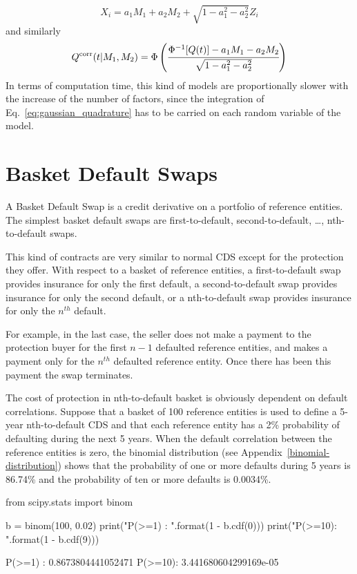 \begin{equation}
X_i = a_1 M_1 + a_2 M_2 + \sqrt{1 - a_1^2 - a^2_2}Z_i
\end{equation}
and similarly
\begin{equation}
Q^{\textrm{corr}}(t|M_1, M_2) = \Phi\left(\cfrac{\Phi^{-1}[Q(t)]-a_1 M_1 - a_2 M_2}{\sqrt{1 - a_1^2 - a^2_2}}\right)
\end{equation}
In terms of computation time, this kind of models are proportionally slower with the increase of the number of factors, since the integration of Eq.~\ref{eq:gaussian_quadrature} has to be carried on each random variable of the model.

\section{Basket Default Swaps}\label{basket-default-swaps}

A Basket Default Swap is a credit derivative on a portfolio of reference
entities. The simplest basket default swaps are first-to-default,
second-to-default, \ldots, nth-to-default swaps. 

This kind of contracts are very similar to normal CDS except for the protection they offer.
With respect to a basket of reference entities, a first-to-default swap provides insurance for only the first default, a second-to-default swap provides insurance
for only the second default, or a nth-to-default swap provides insurance for only the $n^{th}$ default. 

For example, in the last case, the seller does not make a payment to the protection buyer for
the first $n-1$ defaulted reference entities, and makes a payment only for the
$n^{th}$ defaulted reference entity. Once there has been this payment the swap terminates.

The cost of protection in nth-to-default basket is obviously dependent on default correlations. 
Suppose that a basket of 100 reference entities is used to define a 5-year nth-to-default CDS and that each reference entity has a 2\% probability of defaulting during the next
5 years. When the default correlation between the reference entities is zero, the binomial distribution (see Appendix~\ref{binomial-distribution}) 
shows that the probability of one or more defaults during 5 years is 86.74\% and the probability of ten or more defaults is 0.0034\%.

\begin{ipython}
from scipy.stats import binom

b = binom(100, 0.02)
print("P(>=1) : {}".format(1 - b.cdf(0)))
print("P(>=10): {}".format(1 - b.cdf(9)))
\end{ipython}
\begin{ioutput}
P(>=1) : 0.8673804441052471
P(>=10): 3.441680604299169e-05
\end{ioutput}

